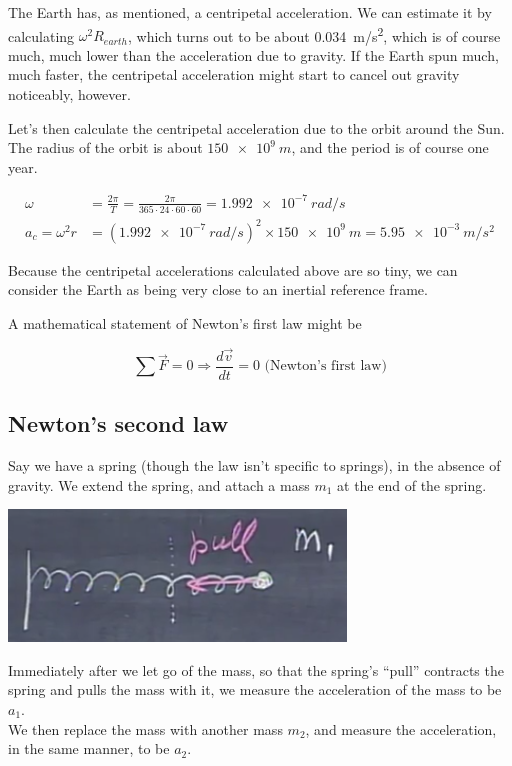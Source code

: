 \documentclass[8.01x]{subfiles}
\begin{document}
The Earth has, as mentioned, a centripetal acceleration. We can estimate it by calculating $\omega^2 R_{earth}$, which turns out to be about \SI{0.034}{m/s^2}, which is of course much, much lower than the acceleration due to gravity. If the Earth spun much, much faster, the centripetal acceleration might start to cancel out gravity noticeably, however.

Let's then calculate the centripetal acceleration due to the orbit around the Sun. The radius of the orbit is about $\SI{150e9}{m}$, and the period is of course one year.

\begin{align}
\omega &= \frac{2 \pi}{T} = \frac{2 \pi}{365 \cdot 24 \cdot 60 \cdot 60} = \SI{1.992e-7}{rad/s}\\
a_c = \omega^2 r &= (\SI{1.992e-7}{rad/s})^2 \times \SI{150e9}{m} = \SI{5.95e-3}{m/s^2}
\end{align}

Because the centripetal accelerations calculated above are so tiny, we can consider the Earth as being very close to an inertial reference frame.

A mathematical statement of Newton's first law might be

\begin{equation}
\sum \vec{F} = 0 \Rightarrow \frac{d\vec{v}}{dt} = 0 \text{ (Newton's first law)} \label{eq:newton1}
\end{equation}

\subsection{Newton's second law}

Say we have a spring (though the law isn't specific to springs), in the absence of gravity. We extend the spring, and attach a mass $m_1$ at the end of the spring.

\begin{center}
\includegraphics[scale=0.6]{Graphics/lec6_newton2}
\end{center}

Immediately after we let go of the mass, so that the spring's ``pull'' contracts the spring and pulls the mass with it, we measure the acceleration of the mass to be $a_1$.\\
We then replace the mass with another mass $m_2$, and measure the acceleration, in the same manner, to be $a_2$.
\end{document}
